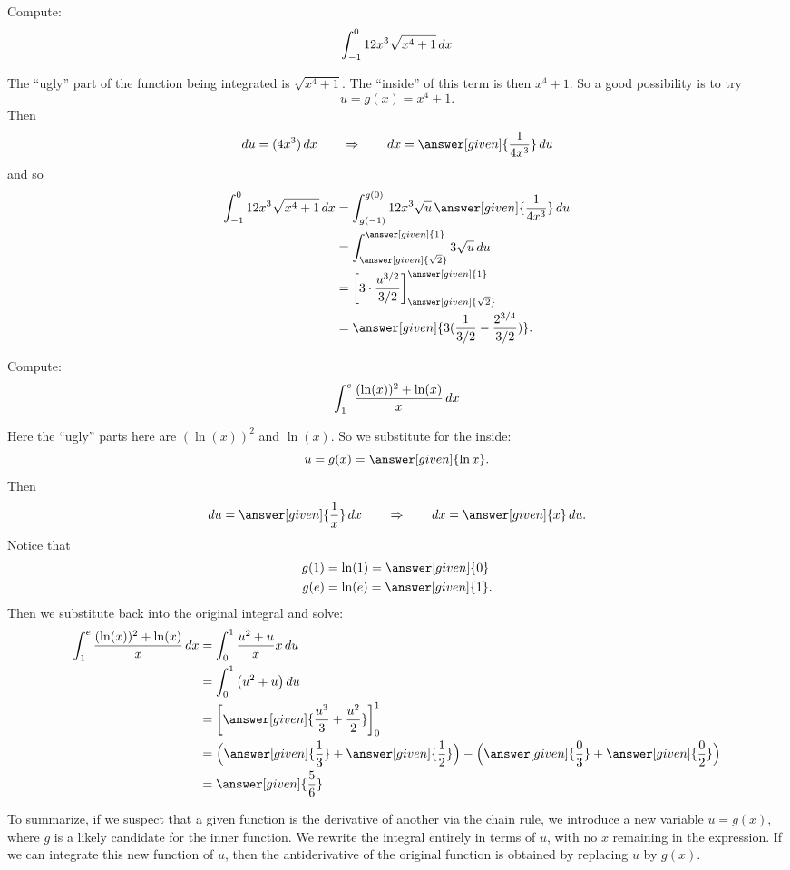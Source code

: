 \documentclass{ximera}
\begin{document}
\begin{example}
Compute:
\[
\int_{-1}^0 12x^3 \sqrt{x^4+1} \mathop{}\!d x
\]
\begin{explanation}
The ``ugly'' part of the function being integrated is $\sqrt{x^4+1}$.  The
``inside'' of this term is then $x^4+1$.  So a good possibility is to
try
\[
u =g(x)= x^4+1.
\]
Then
\[
\d u = (4x^3) \d x 	\qquad	\Rightarrow	\qquad	\d x = \answer[given]{\frac{1}{4x^3}} \d u
\]
and so
\begin{align*}
\int_{-1}^0 12x^3 \sqrt{x^4+1} \d x &= \int_{g(-1)}^{g(0)} 12 x^3 \sqrt{u}\, \answer[given]{\frac{1}{4x^3}} \d u  \\
&= \int_{\answer[given]{\sqrt{2}}}^{\answer[given]{1}} 3 \sqrt{u} \d u  \\
&= \eval{3\cdot \frac{u^{3/2}}{3/2}}_{\answer[given]{\sqrt{2}}}^{\answer[given]{1}}  \\
&= \answer[given]{3(\frac{1}{3/2}-\frac{2^{3/4}}{3/2})}.
\end{align*}
\end{explanation}
\end{example}




\begin{example}
  Compute:
  \[
  \int_{1}^{e} \frac{(\ln(x))^2+\ln(x)}{x} \mathop{}\!d x
  \]
\begin{explanation}
Here the ``ugly'' parts here are $(\ln(x))^2$ and $\ln(x)$.  So we substitute for
the inside:
\[
u=g(x)=\answer[given]{\ln x}.
\]
Then
\[
\d u =  \answer[given]{\frac{1}{x}} \d x 	\qquad	\Rightarrow	\qquad	\d x = \answer[given]{x} \d u.
\]
Notice that
\begin{align*}
g(1) &= \ln (1) = \answer[given]{0} \\
g(e) &= \ln (e) = \answer[given]{1}.
\end{align*}
Then we substitute back into the original integral and solve:
\begin{align*}
\int_{1}^{e} \frac{(\ln(x))^2+\ln(x)}{x} \d x &= \int_0^{1} \frac{u^2+u}{x} x \d u  \\
&= \int_0^{1} \left(u^2+u\right) \d u  \\
&= \eval{\answer[given]{\frac{u^3}{3}+\frac{u^2}{2}}}_{0}^{1}  \\
&= \Bigl(\answer[given]{\frac13}+\answer[given]{\frac12}\Bigr)-\Bigl( \answer[given]{\frac03}+\answer[given]{\frac02} \Bigr)\\
&= \answer[given]{\frac{5}{6}}
\end{align*}
\end{explanation}
\end{example}

To summarize, if we suspect that a given function is the derivative of
another via the chain rule, we introduce a new variable $u=g(x)$, where $g$ is a likely candidate for
the inner function. We rewrite the integral
 entirely in terms of $u$, with no $x$ remaining in the
expression. If we can integrate this new function of $u$, then the
antiderivative of the original function is obtained by replacing $u$
by $g(x)$.
\end{document}
